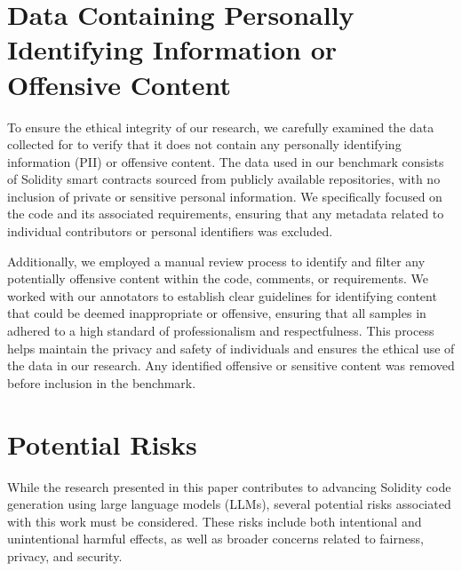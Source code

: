 \section{Data Containing Personally Identifying Information or Offensive Content}

To ensure the ethical integrity of our research, we carefully examined the data collected for \datasetname to verify that it does not contain any personally identifying information (PII) or offensive content. The data used in our benchmark consists of Solidity smart contracts sourced from publicly available repositories, with no inclusion of private or sensitive personal information. We specifically focused on the code and its associated requirements, ensuring that any metadata related to individual contributors or personal identifiers was excluded.

Additionally, we employed a manual review process to identify and filter any potentially offensive content within the code, comments, or requirements. We worked with our annotators to establish clear guidelines for identifying content that could be deemed inappropriate or offensive, ensuring that all samples in \datasetname adhered to a high standard of professionalism and respectfulness. This process helps maintain the privacy and safety of individuals and ensures the ethical use of the data in our research. Any identified offensive or sensitive content was removed before inclusion in the benchmark.


\section{Potential Risks}

While the research presented in this paper contributes to advancing Solidity code generation using large language models (LLMs), several potential risks associated with this work must be considered. These risks include both intentional and unintentional harmful effects, as well as broader concerns related to fairness, privacy, and security.

